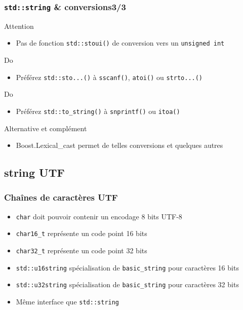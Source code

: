 \documentclass[C++.tex]{subfiles}
\begin{document}
\begin{frame}[fragile]
	\frametitle{\lstinline|std::string| \& conversions\titlehfill{}3/3}
	\begin{alertblock}{Attention}
		\begin{itemize}
			\item Pas de fonction \lstinline|std::stoui()| de conversion vers un \lstinline|unsigned int|
		\end{itemize}
	\end{alertblock}

	\begin{exampleblock}{Do}
		\begin{itemize}
			\item Préférez \lstinline|std::sto...()| à \lstinline|sscanf()|, \lstinline|atoi()| ou \lstinline|strto...()|
		\end{itemize}
	\end{exampleblock}

	\begin{exampleblock}{Do}
		\begin{itemize}
			\item Préférez \lstinline|std::to_string()| à \lstinline|snprintf()| ou \lstinline|itoa()|
		\end{itemize}
	\end{exampleblock}

	\begin{block}{Alternative et complément}
		\begin{itemize}
			\item Boost.Lexical\_cast permet de telles conversions et quelques autres
		\end{itemize}
	\end{block}
\end{frame}

\subsection*{string UTF}
\begin{frame}[fragile]
	\frametitle{Chaînes de caractères UTF}
	\begin{itemize}
		\item \lstinline|char| doit pouvoir contenir un encodage 8 bits UTF-8


		\item \lstinline|char16_t| représente un code point 16 bits
		\item \lstinline|char32_t| représente un code point 32 bits
		\item \lstinline|std::u16string| spécialisation de \lstinline|basic_string| pour caractères 16 bits
		\item \lstinline|std::u32string| spécialisation de \lstinline|basic_string| pour caractères 32 bits
		\item Même interface que \lstinline|std::string|
	\end{itemize}
\end{frame}
\end{document}
